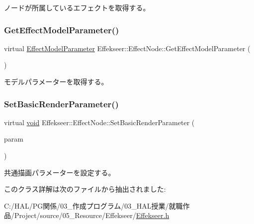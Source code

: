 ノードが所属しているエフェクトを取得する。 

\mbox{\label{class_effekseer_1_1_effect_node_a6fc47c5de5057a81240d4df22887b2c2}} 
\subsubsection{\texorpdfstring{Get\+Effect\+Model\+Parameter()}{GetEffectModelParameter()}}
{\footnotesize\ttfamily virtual \mbox{\hyperlink{struct_effekseer_1_1_effect_model_parameter}{Effect\+Model\+Parameter}} Effekseer\+::\+Effect\+Node\+::\+Get\+Effect\+Model\+Parameter (\begin{DoxyParamCaption}{ }\end{DoxyParamCaption})\hspace{0.3cm}{\ttfamily [pure virtual]}}



モデルパラメーターを取得する。 

\mbox{\label{class_effekseer_1_1_effect_node_a064ec945f4ced3b7935520d625e4c92e}} 
\subsubsection{\texorpdfstring{Set\+Basic\+Render\+Parameter()}{SetBasicRenderParameter()}}
{\footnotesize\ttfamily virtual \mbox{\hyperlink{namespace_effekseer_ab34c4088e512200cf4c2716f168deb56}{void}} Effekseer\+::\+Effect\+Node\+::\+Set\+Basic\+Render\+Parameter (\begin{DoxyParamCaption}\item[{\mbox{\hyperlink{struct_effekseer_1_1_effect_basic_render_parameter}{Effect\+Basic\+Render\+Parameter}}}]{param }\end{DoxyParamCaption})\hspace{0.3cm}{\ttfamily [pure virtual]}}



共通描画パラメーターを設定する。 



このクラス詳解は次のファイルから抽出されました\+:\begin{DoxyCompactItemize}
\item 
C\+:/\+H\+A\+L/\+P\+G関係/03\+\_\+作成プログラム/03\+\_\+\+H\+A\+L授業/就職作品/\+Project/source/05\+\_\+\+Resource/\+Effekseer/\mbox{\hyperlink{_effekseer_8h}{Effekseer.\+h}}\end{DoxyCompactItemize}
